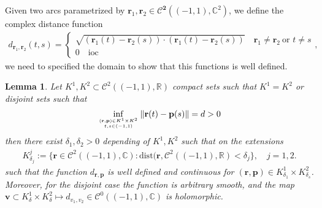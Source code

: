 \documentclass{article}
\newtheorem{lemma}[theorem]{Lemma}
\newcommand{\IC}{{\mathbb C}}
\begin{document}
Given two arcs parametrized by $\mathbf{r}_1, \mathbf{r}_2 \in \mathbf{\mathcal{C}^2}((-1,1),\mathbb{C}^2)$, we define the complex distance function 
\begin{align}
\label{eq:distext}
d_{\mathbf{r}_1,\mathbf{r}_2}(t,s) =  \begin{cases}\sqrt{(\mathbf{r}_1(t)-\mathbf{r}_2(s))\cdot(\mathbf{r}_1(t)-\mathbf{r}_2(s))}  \quad \mathbf{r}_1 \neq\mathbf{r}_2 \ \text{or } t \neq s\\
0 \quad \text{ioc}\end{cases}, 
\end{align}
we need to specified the domain to show that this functions is well defined. 
\begin{lemma}
\label{lemma:dlemma1}
Let $K^1, K^2 \subset \mathcal{C}^2((-1,1),\mathbb{R})$ compact sets such that $K^1 = K^2$ or disjoint sets such that 
\begin{align*}
\inf_{(\mathbf{r},\mathbf{p}) \in K^1 \times K^2 \atop t,s \in (-1,1) } \| \mathbf{r}(t)- \mathbf{p}(s) \|  = d >0
\end{align*}
then there exist $\delta_1, \delta_2 >0$ depending of $K^1, K^2$  such that on the extensions
\begin{align*}
K^j_{\delta_j} := 
\{
\mathbf{r} \in \mathcal{C}^2((-1,1),\mathbb{C}): \text{dist}(\mathbf{r},\mathcal{C}^2((-1,1),\mathbb{R})  < \delta_j 
\}, \quad j =1,2. 
\end{align*}
such that the function $d_{\mathbf{r},\mathbf{p}}$ is well defined and continuous for $(\mathbf{r},\mathbf{p}) \in K^1_{\delta_1}\times K^2_{\delta_s}$. Moreover, for the disjoint case the function is arbitrary smooth, and the map $\mathbf{v} \subset K^1_\delta \times K^2_\delta \mapsto d_{v_1, v_2} \in \mathbf{\mathcal{C}}^0((-1,1),\IC)$ is holomorphic. 
\end{lemma}
\end{document}
